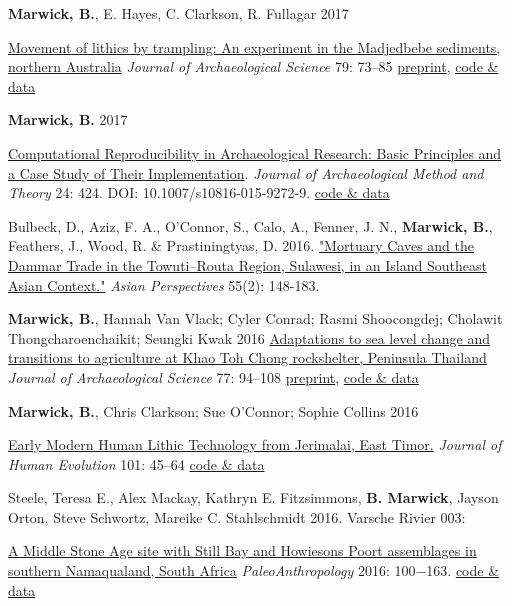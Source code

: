 \documentclass[11pt,article,oneside]{memoir}
\begin{document}
\ind  \textbf{Marwick, B.}, E. Hayes, C. Clarkson, R. Fullagar 2017 {\href{https://doi.org/10.1016/j.jas.2017.01.008}{Movement of lithics by trampling: An experiment in the Madjedbebe sediments, northern Australia} \textit{Journal of Archaeological Science}  79: 73–85 \href{https://doi.org/10.17605/OSF.IO/V2MS9}{preprint}, \href{https://doi.org/10.17605/OSF.IO/EDZXS}{code \& data}

\ind \textbf{Marwick, B.} 2017 {\href{http://dx.doi.org/10.1007/s10816-015-9272-9}{Computational Reproducibility in Archaeological Research: Basic Principles and a Case Study of Their Implementation}. \textit{Journal of Archaeological Method and Theory} 24: 424. DOI: 10.1007/s10816-015-9272-9. \href{https://doi.org/10.6084/m9.figshare.1563661}{code \& data}

\ind  Bulbeck, D., Aziz, F. A.,  O'Connor, S.,  Calo, A., Fenner, J. N., \textbf{Marwick, B.},  Feathers, J.,  Wood, R. \& Prastiningtyas, D. 2016. \href{http://dx.doi.org/10.1353/asi.2016.0017}{"Mortuary Caves and the Dammar Trade in the Towuti–Routa Region, Sulawesi, in an Island Southeast Asian Context."} \textit{Asian Perspectives} 55(2): 148-183.

\ind  \textbf{Marwick, B.}, Hannah Van Vlack; Cyler Conrad; Rasmi Shoocongdej; \newline Cholawit Thongcharoenchaikit; Seungki Kwak 2016 \href{http://dx.doi.org/10.1016/j.jas.2016.10.010}{Adaptations to sea level change and transitions to agriculture at Khao Toh Chong rockshelter, Peninsula Thailand} \textit{Journal of Archaeological Science} 77: 94–108 \href{https://osf.io/preprints/socarxiv/axxf8/}{preprint}, \href{https://dx.doi.org/10.6084/m9.figshare.2065602}{code \& data}

\ind  \textbf{Marwick, B.}, Chris Clarkson; Sue O'Connor; Sophie Collins 2016 {\href{http://dx.doi.org/10.1016/j.jhevol.2016.09.004}{Early Modern Human Lithic Technology from Jerimalai, East Timor.} \textit{Journal of Human Evolution} 101: 45–64 \href{http://dx.doi.org/10.6084/m9.figshare.985406}{code \& data}

\ind Steele, Teresa E., Alex Mackay, Kathryn E. Fitzsimmons,  \textbf{B. Marwick}, Jayson Orton, Steve Schwortz, Mareike C. Stahlschmidt 2016. Varsche Rivier 003:  {\href{http://www.paleoanthro.org/media/journal/content/PA20160100.pdf}{A Middle Stone Age site with Still Bay and Howiesons Poort assemblages in southern Namaqualand, South Africa} \textit{PaleoAnthropology} 2016: 100−163. \href{https://github.com/benmarwick/Steele_et_al_VR003_MSA_Pigments}{code \& data}

}}}}
\end{document}
